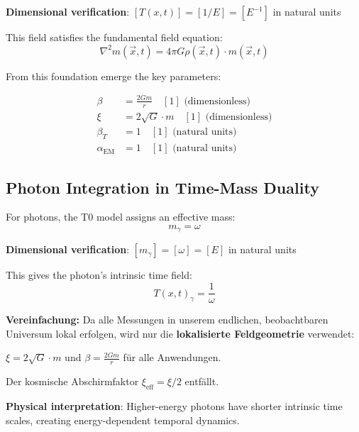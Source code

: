 \documentclass[12pt,a4paper]{article}
\newcommand{\Tfield}{T(x,t)}
\begin{document}
	\textbf{Dimensional verification}: $[\Tfield] = [1/E] = [E^{-1}]$ in natural units \checkmark
	
	This field satisfies the fundamental field equation:
	\begin{equation}
		\nabla^2 m(\vec{x},t) = 4\pi G \rho(\vec{x},t) \cdot m(\vec{x},t)
		\label{eq:field_equation}
	\end{equation}
	
	From this foundation emerge the key parameters:
	
	\begin{tcolorbox}[colback=blue!5!white,colframe=blue!75!black,title=T0 Model Parameters for Photon Analysis]
		\begin{align}
			\beta &= \frac{2Gm}{r} \quad [1] \text{ (dimensionless)} \\
			\xi &= 2\sqrt{G} \cdot m \quad [1] \text{ (dimensionless)} \\
			\beta_T &= 1 \quad [1] \text{ (natural units)} \\
			\alpha_{\text{EM}} &= 1 \quad [1] \text{ (natural units)}
		\end{align}
	\end{tcolorbox}
	
	\subsection{Photon Integration in Time-Mass Duality}
	
	For photons, the T0 model assigns an effective mass:
	\begin{equation}
		m_\gamma = \omega
		\label{eq:photon_effective_mass}
	\end{equation}
	
	\textbf{Dimensional verification}: $[m_\gamma] = [\omega] = [E]$ in natural units \checkmark
	
	This gives the photon's intrinsic time field:
	\begin{equation}
		\Tfield_\gamma = \frac{1}{\omega}
		\label{eq:photon_time_field}
	\end{equation}
\begin{tcolorbox}[colback=yellow!5!white,colframe=orange!75!black,title=Praktische Vereinfachung]
	\textbf{Vereinfachung:} Da alle Messungen in unserem endlichen, beobachtbaren Universum lokal erfolgen, wird nur die \textbf{lokalisierte Feldgeometrie} verwendet:
	
	$\xi = 2\sqrt{G} \cdot m$ und $\beta = \frac{2Gm}{r}$ für alle Anwendungen.
	
	Der kosmische Abschirmfaktor $\xi_{\text{eff}} = \xi/2$ entfällt.
\end{tcolorbox}	
	\textbf{Physical interpretation}: Higher-energy photons have shorter intrinsic time scales, creating energy-dependent temporal dynamics.
	
\end{document}
